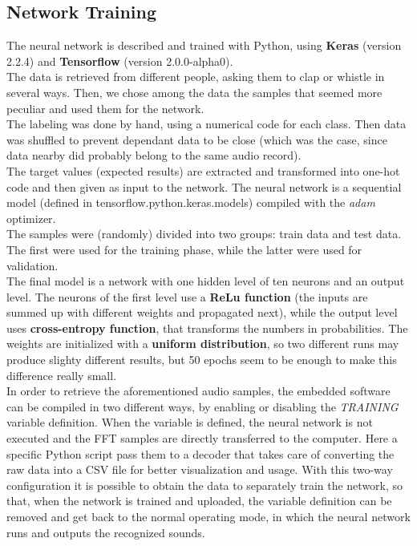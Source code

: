 \documentclass[12pt]{article}
\begin{document}
\subsection{Network Training}
The neural network is described and trained with Python, using \textbf{Keras} (version 2.2.4) and \textbf{Tensorflow} (version 2.0.0-alpha0).\\
The data is retrieved from different people, asking them to clap or whistle in several ways. Then, we chose among the data the samples that seemed more peculiar and used them for the network.\\
The labeling was done by hand, using a numerical code for each class. Then data was shuffled to prevent dependant data to be close (which was the case, since data nearby did probably belong to the same audio record).\\
The target values (expected results) are extracted and transformed into one-hot code and then given as input to the network. The neural network is a sequential model (defined in tensorflow.python.keras.models) compiled with the \textit{adam} optimizer.\\
The samples were (randomly) divided into two groups: train data and test data. The first were used for the training phase, while the latter were used for validation.\\
The final model is a network with one hidden level of ten neurons and an output level. The neurons of the first level use a \textbf{ReLu function} (the inputs are summed up with different weights and propagated next), while the output level uses \textbf{cross-entropy function}, that transforms the numbers in probabilities. The weights are initialized with a \textbf{uniform distribution}, so two different runs may produce slighty different results, but 50 epochs seem to be enough to make this difference really small.\\
In order to retrieve the aforementioned audio samples, the embedded software can be compiled in two different ways, by enabling or disabling the \textit{TRAINING} variable definition. When the variable is defined, the neural network is not executed and the FFT samples are directly transferred to the computer. Here a specific Python script pass them to a decoder that takes care of converting the raw data into a CSV file for better visualization and usage. With this two-way configuration it is possible to obtain the data to separately train the network, so that, when the network is trained and uploaded, the variable definition can be removed and get back to the normal operating mode, in which the neural network runs and outputs the recognized sounds.
\end{document}

